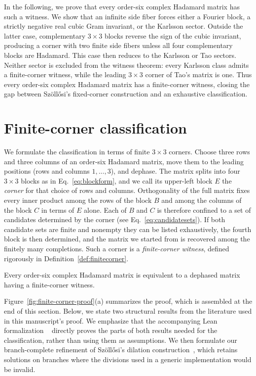 In the following, we prove that every order-six complex Hadamard matrix has such a witness. We show that an infinite side fiber forces either a Fourier block, a strictly negative real cubic Gram invariant, or the Karlsson sector. Outside the latter case, complementary $3\times3$ blocks reverse the sign of the cubic invariant, producing a corner with two finite side fibers unless all four complementary blocks are Hadamard. This case then reduces to the Karlsson or Tao sectors. Neither sector is excluded from the witness theorem: every Karlsson class admits a finite-corner witness, while the leading $3\times3$ corner of Tao's matrix is one. Thus every order-six complex Hadamard matrix has a finite-corner witness, closing the gap between Sz\"oll\H{o}si's fixed-corner construction and an exhaustive classification.

\section{Finite-corner classification}
\label{sec:mainclassification}

We formulate the classification in terms of finite $3\times3$ corners.
Choose three rows and three columns of an order-six Hadamard matrix, move them to the leading positions (rows and columns $1,...,3$), and dephase. The matrix splits into four $3\times3$ blocks as in Eq.~\eqref{eq:blockform}, and we call its upper-left block $E$ the \emph{corner} for that choice of rows and columns. Orthogonality of the full matrix fixes every inner product among the rows of the block $B$ and among the columns of the block $C$ in terms of $E$ alone. Each of $B$ and $C$ is therefore confined to a set of candidates determined by the corner (see Eq.~\eqref{eq:candidatesets}).
If both candidate sets are finite and nonempty they can be listed exhaustively, the fourth block is then determined, and the matrix we started from is recovered among the finitely many completions. Such a corner is a \emph{finite-corner witness}, defined rigorously in Definition~\ref{def:finitecorner}.

\begin{theorem}
\label{thm:classification}
Every order-six complex Hadamard matrix is equivalent to a dephased matrix
having a finite-corner witness.
\end{theorem}

Figure~\ref{fig:finite-corner-proof}(a) summarizes the proof, which is assembled at the end of this section. Below, we state two structural results from the literature used in this manuscript's proof. We emphasize that the accompanying Lean formalization ~\cite{CardenesWuttig2026HadamardRepository} directly proves the parts of both results needed for the classification, rather than using them as assumptions. We then formulate our branch-complete refinement of Sz\"oll\H{o}si's dilation construction~\cite{Szollosi2012FourParameter}, which retains solutions on branches where the divisions used in a generic implementation would be invalid.

